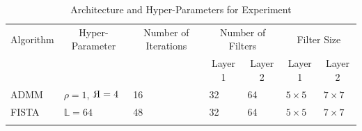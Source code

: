 \begin{table}[] 
\caption{Architecture and Hyper-Parameters for Experiment}
\begin{center}
\begin{tabular}{@{}lllllll@{}}
\toprule
\multicolumn{1}{c}{Algorithm} & \multicolumn{1}{c}{Hyper-Parameter} & \multicolumn{1}{c}{Number of Iterations} & \multicolumn{2}{c}{Number of Filters}                     & \multicolumn{2}{c}{Filter Size}                           \\ %
      &      &            & \multicolumn{1}{c}{Layer 1} & \multicolumn{1}{c}{Layer 2} & \multicolumn{1}{c}{Layer 1} & \multicolumn{1}{c}{Layer 2} \\ \midrule
ADMM                          & $\rho = 1$, $\reflectbox{R} = 4$                     & 16                        & 32                          & 64                          & $5 \times 5$                & $7 \times 7$                \\
FISTA                         & $\mathbb{L} = 64$                      & 48                            & 32                          & 64                          & $5 \times 5$                & $7 \times 7$                \\ \bottomrule
\label{table:JPEG Artifact Removal Architecture}
\end{tabular}
\end{center}
\end{table}
